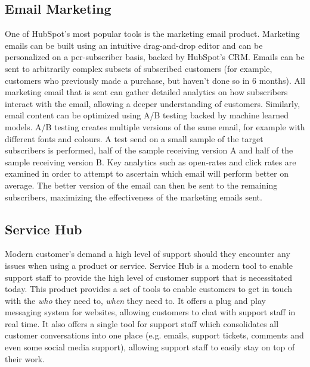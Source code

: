 \subsection{Email Marketing}
One of HubSpot's most popular tools is the marketing email product. Marketing emails can be built using an intuitive drag-and-drop editor and can be personalized on a per-subscriber basis, backed by HubSpot's CRM. Emails can be sent to arbitrarily complex subsets of subscribed customers (for example, customers who previously made a purchase, but haven't done so in 6 months). All marketing email that is sent can gather detailed analytics on how subscribers interact with the email, allowing a deeper understanding of customers. Similarly, email content can be optimized using A/B testing backed by machine learned models. A/B testing creates multiple versions of the same email, for example with different fonts and colours. A test send on a small sample of the target subscribers is performed, half of the sample receiving version A and half of the sample receiving version B. Key analytics such as open-rates and click rates are examined in order to attempt to ascertain which email will perform better on average. The better version of the email can then be sent to the remaining subscribers, maximizing the effectiveness of the marketing emails sent.

\subsection{Service Hub}
Modern customer's demand a high level of support should they encounter any issues when using a product or service. Service Hub is a modern tool to enable support staff to provide the high level of customer support that is necessitated today. This product provides a set of tools to enable customers to get in touch with the \textit{who} they need to, \textit{when} they need to. It offers a plug and play messaging system for websites, allowing customers to chat with support staff in real time. It also offers a single tool for support staff which consolidates all customer conversations into one place (e.g. emails, support tickets, comments and even some social media support), allowing support staff to easily stay on top of their work. 


